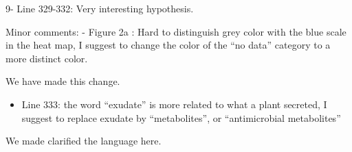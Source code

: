 \documentclass[11pt,]{article}
\providecommand{\tightlist}{%
\setlength{\itemsep}{0pt}\setlength{\parskip}{0pt}}
\begin{document}
\begin{blockquote}
9- Line 329-332: Very interesting hypothesis.
\end{blockquote}

\begin{blockquote}
Minor comments: - Figure 2a : Hard to distinguish grey color with the
blue scale in the heat map, I suggest to change the color of the ``no
data'' category to a more distinct color.
\end{blockquote}

We have made this change.

\begin{blockquote}
\begin{itemize}
\tightlist
\item
  Line 333: the word ``exudate'' is more related to what a plant
  secreted, I suggest to replace exudate by ``metabolites'', or
  ``antimicrobial metabolites''
\end{itemize}
\end{blockquote}

We made clarified the language here.




\newpage
\singlespacing
\end{document}
